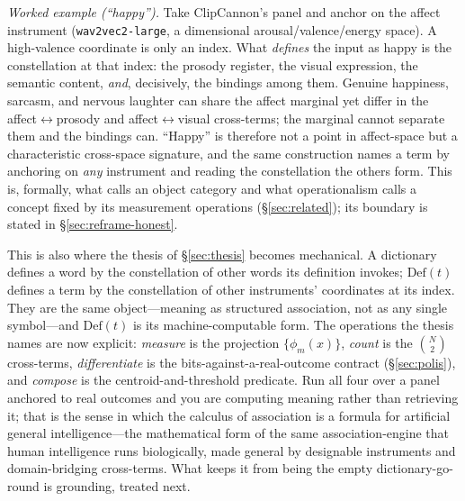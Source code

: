\documentclass[10pt,twocolumn]{article}
\begin{document}
\emph{Worked example (``happy'').} Take ClipCannon's panel and anchor on the
affect instrument (\texttt{wav2vec2-large}, a dimensional arousal/valence/energy
space). A high-valence coordinate is only an index. What \emph{defines} the input
as happy is the constellation at that index: the prosody register, the visual
expression, the semantic content, \emph{and}, decisively, the bindings among
them. Genuine happiness, sarcasm, and nervous laughter can share the affect
marginal yet differ in the affect$\leftrightarrow$prosody and
affect$\leftrightarrow$visual cross-terms; the marginal cannot separate them and
the bindings can. ``Happy'' is therefore not a point in affect-space but a
characteristic cross-space signature, and the same construction names a term by
anchoring on \emph{any} instrument and reading the constellation the others form.
This is, formally, what \citet{gardenfors2000conceptual} calls an object category
and what operationalism \citep{bridgman1927logic} calls a concept fixed by its
measurement operations (\S\ref{sec:related}); its boundary is stated in
\S\ref{sec:reframe-honest}.

This is also where the thesis of \S\ref{sec:thesis} becomes mechanical. A
dictionary defines a word by the constellation of other words its definition
invokes; $\mathrm{Def}(t)$ defines a term by the constellation of other
instruments' coordinates at its index. They are the same object---meaning as
structured association, not as any single symbol---and $\mathrm{Def}(t)$ is its
machine-computable form. The operations the thesis names are now explicit:
\emph{measure} is the projection $\{\phi_m(x)\}$, \emph{count} is the
$\binom{N}{2}$ cross-terms, \emph{differentiate} is the bits-against-a-real-outcome
contract (\S\ref{sec:polis}), and \emph{compose} is the centroid-and-threshold
predicate. Run all four over a panel anchored to real outcomes and you are
computing meaning rather than retrieving it; that is the sense in which the
calculus of association is a formula for artificial general intelligence---the
mathematical form of the same association-engine that human intelligence runs
biologically, made general by designable instruments and domain-bridging
cross-terms. What keeps it from being the empty dictionary-go-round is grounding,
treated next.
\end{document}
